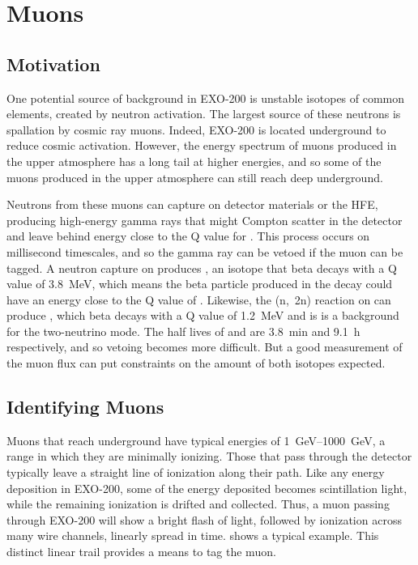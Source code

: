 \documentclass[herrin-thesis.tex]{subfiles}
\begin{document}
\chapter{Muons}
\label{ch:muons}

\section{Motivation}
\label{sec:muon_motivation}
One potential source of background in EXO-200 is unstable isotopes of common elements, created by neutron activation. The largest source of these neutrons is spallation by cosmic ray muons. Indeed, EXO-200 is located underground to reduce cosmic activation. However, the energy spectrum of muons produced in the upper atmosphere has a long tail at higher energies, and so some of the muons produced in the upper atmosphere can still reach deep underground.

Neutrons from these muons can capture on detector materials or the HFE, producing high-energy gamma rays that might Compton scatter in the detector and leave behind energy close to the Q value for . This process occurs on millisecond timescales, and so the gamma ray can be vetoed if the muon can be tagged. A neutron capture on  produces , an isotope that beta decays with a Q value of \SI{3.8}{\MeV}, which means the beta particle produced in the decay could have an energy close to the Q value of . Likewise, the (n,~2n) reaction on  can produce , which beta decays with a Q value of \SI{1.2}{\MeV} and is is a background for the two-neutrino mode. The half lives of  and  are \SI{3.8}{\minute} and \SI{9.1}{\hour} respectively, and so vetoing becomes more difficult. But a good measurement of the muon flux can put constraints on the amount of both isotopes expected.

\section{Identifying Muons}
\label{sec:muon_id}
Muons that reach underground have typical energies of \SIrange{1}{1000}{\GeV}, a range in which they are minimally ionizing. Those that pass through the detector typically leave a straight line of ionization along their path. Like any energy deposition in EXO-200, some of the energy deposited becomes scintillation light, while the remaining ionization is drifted and collected. Thus, a muon passing through EXO-200 will show a bright flash of light, followed by ionization across many wire channels, linearly spread in time.  shows a typical example. This distinct linear trail provides a means to tag the muon.
\end{document}
